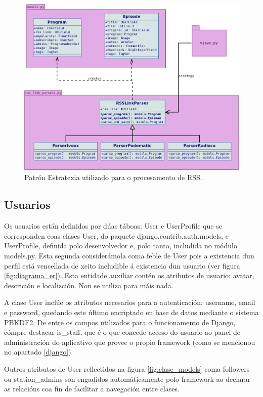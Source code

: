 \begin{figure}[h]
	\centering
	\includegraphics[scale=0.5,keepaspectratio=true]{./images/strategy.png}
	\caption{Patrón Estratexia utilizado para o procesamento de RSS.}
	\label{fig:strategy}
\end{figure}


\subsection{Usuarios}

Os usuarios están definidos por dúas táboas: User e UserProfile que se corresponden coas clases User, do paquete django.contrib.auth.models, e UserProfile, definida polo desenvolvedor e, polo tanto, includida no módulo models.py. Esta segunda considerámola coma feble de User pois a existencia dun perfil está vencellada de xeito ineludible á existencia dun usuario (ver figura \ref{fig:diagrama_er}). Esta entidade auxiliar contén os atributos de usuario: avatar, descrición e localizción. Non se utiliza para máis nada.

A clase User inclúe os atributos necesarios para a autenticación: username, email e password, quedando este último encriptado en base de datos mediante o sistema PBKDF2. De entre os campos utilizados para o funcionamento de Django, cómpre destacar is\_staff, que é o que concede acceso do usuario ao panel de administración do aplicativo que provee o propio framework (como se mencionou no apartado \ref{django})

Outros atributos de User reflectidos na figura \ref{fig:clase_models} coma followers ou station\_admins son engadidos automáticamente polo framework ao declarar as relacións coa fin de facilitar a navegación entre clases.


